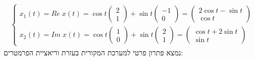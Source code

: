 \documentclass{article}
\begin{document}
\begin{align*}
    \begin{cases}
        x_1(t)=Re\;x(t)=\cos t \begin{pmatrix}
                                   2 \\
                                   1
                               \end{pmatrix} + \sin t \begin{pmatrix}
                                                          -1 \\
                                                          0
                                                      \end{pmatrix} =\begin{pmatrix}
                                                                         2\cos t - \sin t \\
                                                                         \cos t
                                                                     \end{pmatrix} \\
        x_2(t)=Im\;x(t)=\cos t \begin{pmatrix}
                                   1 \\
                                   0
                               \end{pmatrix}+\sin t \begin{pmatrix}
                                                        2 \\
                                                        1
                                                    \end{pmatrix} = \begin{pmatrix}
                                                                        \cos t + 2\sin t \\
                                                                        \sin t
                                                                    \end{pmatrix}
    \end{cases}
\end{align*}
נמצא פתרון פרטי למערכת המקורית בעזרת וריאציית הפרמטרים:
\end{document}
